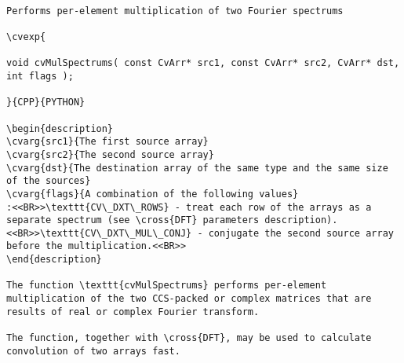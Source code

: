 \begin{verbatim}

Performs per-element multiplication of two Fourier spectrums

\cvexp{

void cvMulSpectrums( const CvArr* src1, const CvArr* src2, CvArr* dst, int flags );

}{CPP}{PYTHON}

\begin{description}
\cvarg{src1}{The first source array}
\cvarg{src2}{The second source array}
\cvarg{dst}{The destination array of the same type and the same size of the sources}
\cvarg{flags}{A combination of the following values}
:<<BR>>\texttt{CV\_DXT\_ROWS} - treat each row of the arrays as a separate spectrum (see \cross{DFT} parameters description).<<BR>>\texttt{CV\_DXT\_MUL\_CONJ} - conjugate the second source array before the multiplication.<<BR>>
\end{description}

The function \texttt{cvMulSpectrums} performs per-element multiplication of the two CCS-packed or complex matrices that are results of real or complex Fourier transform.

The function, together with \cross{DFT}, may be used to calculate convolution of two arrays fast.


\end{verbatim}
